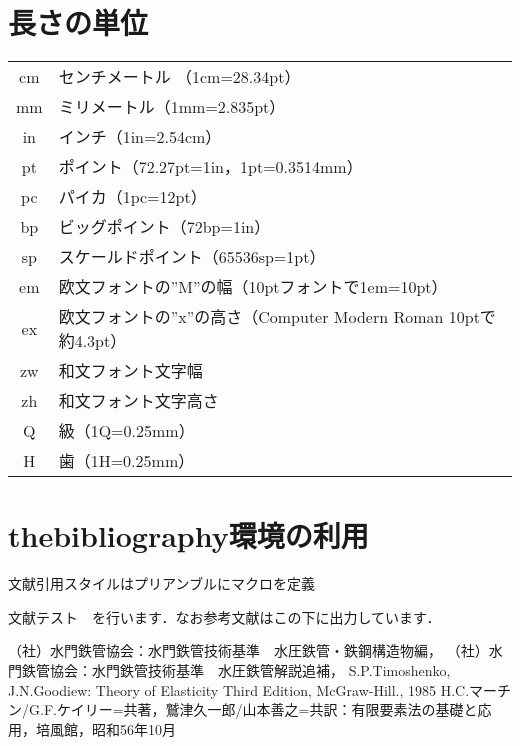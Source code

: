 \documentclass[a4paper,10pt]{jsarticle}
\begin{document}
\section{長さの単位}
\begin{tabular}{cl}
cm & センチメートル （1cm=28.34pt）                                  \\
mm & ミリメートル（1mm=2.835pt）                                     \\
in & インチ（1in=2.54cm）                                            \\
pt & ポイント（72.27pt=1in，1pt=0.3514mm）                           \\
pc & パイカ（1pc=12pt）                                              \\
bp & ビッグポイント（72bp=1in）                                      \\
sp & スケールドポイント（65536sp=1pt）                               \\
em & 欧文フォントの''M''の幅（10ptフォントで1em=10pt）               \\
ex & 欧文フォントの''x''の高さ（Computer Modern Roman 10ptで約4.3pt）\\
zw & 和文フォント文字幅                                              \\
zh & 和文フォント文字高さ                                            \\
Q  & 級（1Q=0.25mm）                                                 \\
H  & 歯（1H=0.25mm）                                                 \\
\end{tabular}





\vspace{1zh}
\section{thebibliography環境の利用}
文献引用スタイルはプリアンブルにマクロを定義

文献テスト~\cite{1}~\cite{2}を行います．なお参考文献はこの下に出力しています．



\vspace{1zh}
\begin{thebibliography}{20}
（社）水門鉄管協会：\newblock 水門鉄管技術基準　水圧鉄管・鉄鋼構造物編，
（社）水門鉄管協会：\newblock 水門鉄管技術基準　水圧鉄管解説追補，
S.P.Timoshenko, J.N.Goodiew: \newblock Theory of Elasticity Third Edition, \newblock McGraw-Hill., 1985
H.C.マーチン/G.F.ケイリー=共著，鷲津久一郎/山本善之=共訳：\newblock 有限要素法の基礎と応用，\newblock 培風館，昭和56年10月
\end{thebibliography}
\end{document}
